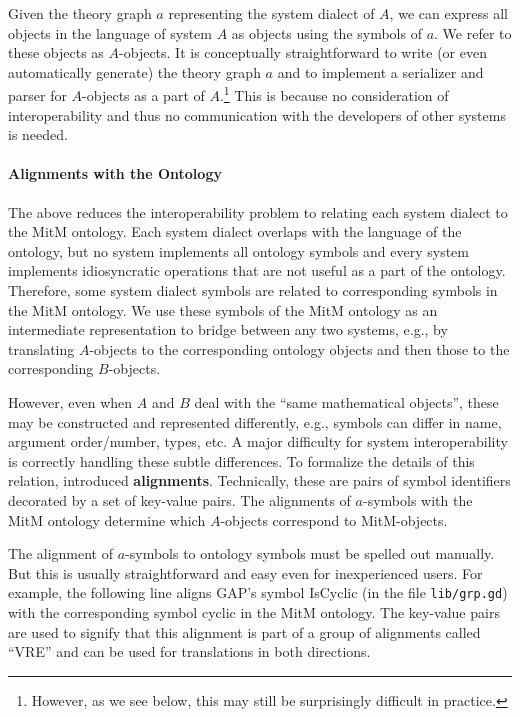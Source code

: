 Given the theory graph $a$ representing the system dialect of $A$, we can express all objects in the language of system $A$ as \OMMT objects using the symbols of $a$.
We refer to these objects as $A$-objects.
It is conceptually straightforward to write (or even automatically generate) the theory graph $a$ and to implement a serializer and parser for $A$-objects as a part of $A$.\footnote{However, as we see below, this may still be surprisingly difficult in practice.}
This is because no consideration of interoperability and thus no communication with the developers of other systems is needed.


\paragraph{Alignments with the Ontology}
The above reduces the interoperability problem to relating each system dialect to the MitM ontology.
Each system dialect overlaps with the language of the ontology, but no system implements all ontology symbols and every system implements idiosyncratic operations that are not useful as a part of the ontology.
Therefore, some system dialect symbols are related to corresponding symbols in the MitM ontology.
We use these symbols of the MitM ontology as an intermediate representation to bridge between any two systems, e.g., by translating $A$-objects to the corresponding ontology objects and then those to the corresponding $B$-objects.

However, even when $A$ and $B$ deal with the ``same mathematical objects'', these may be constructed and represented differently, e.g., symbols can differ in name,
argument order/number, types, etc.
A major difficulty for system interoperability is correctly handling these subtle differences.
To formalize the details of this relation, \cite{MueGauKal:cacfms17} introduced \OMMT \textbf{alignments}.
Technically, these are pairs of \OMMT symbol identifiers decorated by a set of key-value pairs.
The alignments of $a$-symbols with the MitM ontology determine which $A$-objects correspond to MitM-objects.

The alignment of $a$-symbols to ontology symbols must be spelled out manually.
But this is usually straightforward and easy even for inexperienced users. For example, the following line aligns GAP's symbol \textsf{IsCyclic} (in the file \lstinline|lib/grp.gd|) with the corresponding symbol \textsf{cyclic} in the MitM ontology.
The key-value pairs are used to signify that this alignment is part of a group of alignments called ``VRE'' and can be used for translations in both directions.

